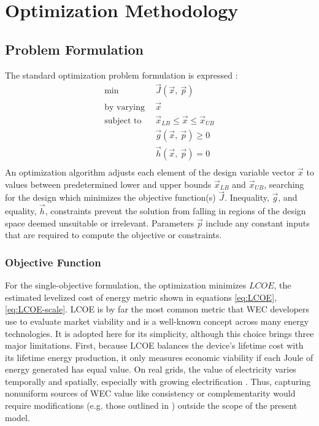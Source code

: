 \section{Optimization Methodology}\label{sec:optim-methods}
\subsection{Problem Formulation}\label{sec:formulation}
The standard optimization problem formulation is expressed \cite{martins_engineering_2022,papalambros_principles_2017}:
\begin{equation}
\begin{aligned}
    \text{min}~~& \vec{J}(\vec{x},~\vec{p}) \\
    \text{by varying}~~&\vec{x} \\
    \text{subject to}~~ &\vec{x}_{LB} \leq \vec{x} \leq \vec{x}_{UB} \\
    &\vec{g}(\vec{x},~\vec{p}) \geq 0\\
    &\vec{h}(\vec{x},~\vec{p})= 0\\
\label{standard}
\end{aligned}
\end{equation}
An optimization algorithm adjusts each element of the design variable vector $\vec{x}$ to values between predetermined lower and upper bounds $\vec{x}_{LB}$ and $\vec{x}_{UB}$, searching for the design which minimizes the objective function(s) $\vec{J}$.
Inequality, $\vec{g}$, and equality, $\vec{h}$, constraints prevent the solution from falling in regions of the design space deemed unsuitable or irrelevant.
Parameters $\vec{p}$ include any constant inputs that are required to compute the objective or constraints.

\subsubsection{Objective Function}\label{sec:obj}
For the single-objective formulation, the optimization minimizes $LCOE$, the estimated levelized cost of energy metric shown in equations \eqref{eq:LCOE}, \eqref{eq:LCOE-scale}.
LCOE is by far the most common metric that WEC developers use to evaluate market viability \cite{trueworthy_wave_2020} and is a well-known concept across many energy technologies.
It is adopted here for its simplicity, although this choice brings three major limitations.
First, because LCOE balances the device's lifetime cost with its lifetime energy production, it only measures economic viability if each Joule of energy generated has equal value.
On real grids, the value of electricity varies temporally and spatially, especially with growing electrification \cite{akdemir_opportunities_2023,bhattacharya_timing_2021,pennock_temporal_2022}.
Thus, capturing nonuniform sources of WEC value like consistency or complementarity would require modifications (e.g. those outlined in \cite{mccabe_system_2023}) outside the scope of the present model.

